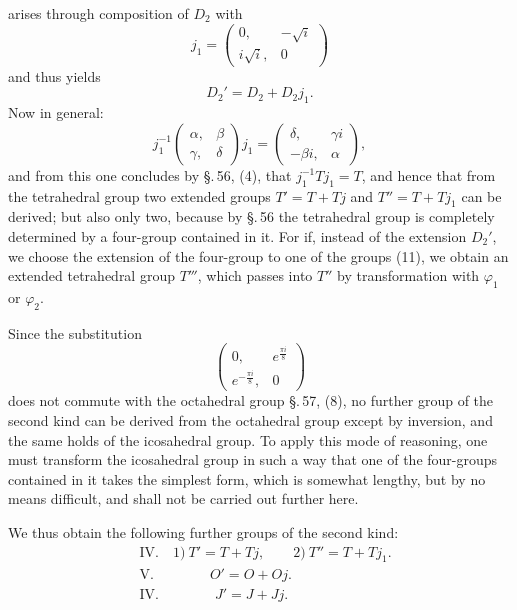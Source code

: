 arises through composition of $D_2$ with
\[
j_1 = \begin{pmatrix} 0, & -\sqrt{i} \\ i\sqrt{i}, & 0 \end{pmatrix}
\]
and thus yields
\[
D_2' = D_2 + D_2 j_1\text{.}
\]
Now in general:
\[
j_1^{-1} \begin{pmatrix} \alpha, & \beta \\ \gamma, & \delta \end{pmatrix} j_1 = \begin{pmatrix} \delta, & \gamma i \\ -\beta i, & \alpha \end{pmatrix},
\]
and from this one concludes by \S.\,56, (4), that $j_1^{-1} T j_1 = T$, and hence that from the tetrahedral group two extended groups $T' = T+Tj$ and $T'' = T+Tj_1$ can be derived; but also only two, because by \S.\,56 the tetrahedral group is completely determined by a four-group contained in it. For if, instead of the extension $D_2'$, we choose the extension of the four-group to one of the groups (11), we obtain an extended tetrahedral group $T'''$, which passes into $T''$ by transformation with $\varphi_1$ or $\varphi_2$.

Since the substitution
\[
\begin{pmatrix} 0, & e^{\frac{\pi i}{8}} \\ e^{-\frac{\pi i}{8}}, & 0 \end{pmatrix}
\]
does not commute with the octahedral group \S.\,57, (8), no further group of the second kind can be derived from the octahedral group except by inversion, and the same holds of the icosahedral group. To apply this mode of reasoning, one must transform the icosahedral group in such a way that one of the four-groups contained in it takes the simplest form, which is somewhat lengthy, but by no means difficult, and shall not be carried out further here.

We thus obtain the following further groups of the second kind:
\[
\begin{aligned}
&\text{IV.}\quad 1)\ T' = T+Tj, \qquad 2)\ T'' = T+Tj_1.\\
&\text{V.}\qquad\qquad O' = O+Oj.\\
&\text{IV.}\qquad\qquad J' = J+Jj.
\end{aligned}
\]

